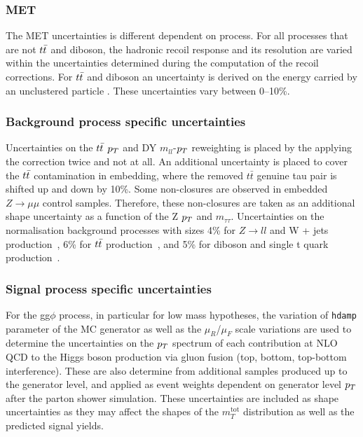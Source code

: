 \subsubsection{MET}
The MET uncertainties is different dependent on process.
For all processes that are not $t\bar{t}$ and diboson, the hadronic recoil response and its resolution are varied within the uncertainties determined during the computation of the recoil corrections.
For $t\bar{t}$ and diboson an uncertainty is derived on the energy carried by an unclustered particle \cite{Sirunyan:2019kia}.
These uncertainties vary between 0--10\%.

\subsubsection{Background process specific uncertainties}
Uncertainties on the $t\bar{t}$ $p_{T}$ and DY $m_{ll}$-$p_{T}$ reweighting is placed by the applying the correction twice and not at all.
An additional uncertainty is placed to cover the $t\bar{t}$ contamination in embedding, where the removed $t\bar{t}$ genuine tau pair is shifted up and down by 10\%.
Some non-closures are observed in embedded $Z\to\mu\mu$ control samples. 
Therefore, these non-closures are taken as an additional shape uncertainty as a function of the Z $p_{T}$ and $m_{\tau\tau}$.
Uncertainties on the normalisation background processes with sizes 4\% for $Z\rightarrow ll$ and W + jets production~\cite{Melnikov:2006kv}, 6\% for 
$t\bar{t}$ production~\cite{Czakon:2011xx,Kidonakis:2013zqa}, and 5\% for diboson and single t quark production~\cite{Kidonakis:2013zqa,Campbell:2011bn,Gehrmann:2014fva}.

\subsubsection{Signal process specific uncertainties}
For the gg$\phi$ process, in particular for low mass hypotheses, the variation of \texttt{hdamp} parameter of the \POWHEG MC generator as well as the $\mu_{R}$/$\mu_{F}$ scale variations are used to determine the uncertainties
on the $p_{T}$ spectrum of each contribution at NLO QCD to the Higgs boson production via gluon fusion (top, bottom, top-bottom interference). These are also determine from additional samples produced
up to the generator level, and applied as event weights dependent on generator level $p_{T}$ after the parton shower simulation. These uncertainties are included as shape uncertainties as they may affect the shapes of the $m_{T}^{\text{tot}}$ distribution as well as the predicted signal yields.

